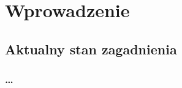 \chapter{Wprowadzenie}
\label{t:int}

\section{Aktualny stan zagadnienia}
\label{t:int:stateofart}

	\subsection{\dots}
